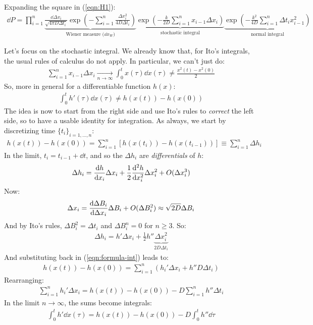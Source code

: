 \documentclass[../template.tex]{subfiles}
\begin{document}
Expanding the square in (\ref{eqn:H1}):
\begin{align}
    \dd{P} = \prod_{i=1}^n \underbrace{\frac{\dd{\Delta x_i}}{\sqrt{4 \pi D \Delta t_i}} \exp\left(-\sum_{i=1}^n \frac{\Delta x_i^2}{4 D \Delta t_i} \right) }_{\text{Wiener measure ($\dd{x_W}$)}} \underbrace{\exp\left(-\frac{k}{2D} \sum_{i=1}^n x_{i-1} \Delta x_i\right)}_{\text{stochastic integral}} \underbrace{\exp\left(-\frac{k^2}{4D} \sum_{i=1}^n \Delta t_i x_{i-1}^2 \right)}_{\text{normal integral}}   
    \label{eqn:dP}
\end{align}

Let's focus on the stochastic integral. We already know that, for Ito's integrals, the usual rules of calculus do not apply. In particular, we can't just do:
\begin{align*}
    \sum_{i=1}^n x_{i-1} \Delta x_i  \xrightarrow[n \to \infty]{}  \int_0^t x(\tau) \dd{x(\tau)} \neq \frac{x^2(t) - x^2(0)}{2}  
\end{align*}
So, more in general for a differentiable function $h(x)$:
\begin{align}
    \int_0^t h'(\tau) \dd{x(\tau)} \neq h(x(t)) - h(x(0)) \label{eqn:formula-int}
\end{align}
The idea is now to start from the right side and use Ito's rules to \textit{correct} the left side, so to have a usable identity for integration. As always, we start by discretizing time $\{t_i\}_{i=1,\dots,n}$:  
\begin{align*}
    h(x(t)) - h(x(0)) = \sum_{i=1}^n [h(x(t_{i})) - h(x(t_{i-1}))] \equiv  
    \sum_{i=1}^n \Delta h_i
\end{align*}
In the limit, $t_{i} = t_{i-1} + \dd{t}$, and so the $\Delta h_i$ are \textit{differentials} of $h$:
\begin{align*}
    \Delta h_i = \dv{h}{x_i} \Delta x_i + \frac{1}{2} \dv[2]{h}{x_i} \Delta x_i^2 + O(\Delta x_i^3) 
\end{align*}
Now:
\begin{align*}
    \Delta x_i = \dv{\Delta B_i}{\Delta x_i} \Delta B_i + O(\Delta B_i^2) \approx \sqrt{2D} \Delta B_i
\end{align*}
And by Ito's rules, $\Delta B_i^2 = \Delta t_i$ and $\Delta B_i^n = 0$ for $n \geq 3$. So:
\begin{align*}
    \Delta h_i = h' \Delta x_i + \frac{1}{2} h'' \underbrace{\Delta x_i^2}_{2 D \Delta t_i}  
\end{align*}
And substituting back in (\ref{eqn:formula-int}) leads to:
\begin{align*}
    h(x(t)) - h(x(0)) = \sum_{i=1}^n (h_i' \Delta x_i + h'' D \Delta t_i)
\end{align*}
Rearranging:
\begin{align*}
    \sum_{i=1}^n h_i' \Delta x_i = h(x(t)) - h(x(0)) - D \sum_{i=1}^n h'' \Delta t_i
\end{align*}
In the limit $n \to \infty$, the sums become integrals:
\begin{align}
    \label{eqn:stoc-int}
    \int_{0}^t h' \dd{x(\tau)} = h(x(t)) - h(x(0)) - D \int_0^t h'' \dd{\tau}
\end{align}
\end{document}
